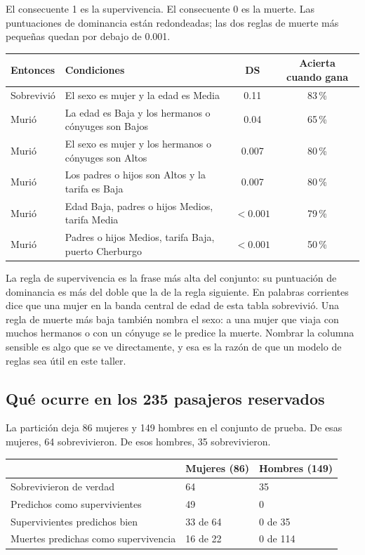 \documentclass[11pt]{article}
\newcommand{\pct}[1]{\mbox{#1\,\%}}
\begin{document}
El consecuente 1 es la supervivencia. El consecuente 0 es la muerte. Las puntuaciones de dominancia están redondeadas; las dos reglas de muerte más pequeñas quedan por debajo de 0.001.

\begin{table}[H]
\centering
\small
\begin{tabularx}{\textwidth}{@{}l Y c c@{}}
\toprule
Entonces & Condiciones & DS & Acierta cuando gana \\
\midrule
{}
Sobrevivió & El sexo es mujer y la edad es Media & 0.11 & \pct{83} \\
Murió & La edad es Baja y los hermanos o cónyuges son Bajos & 0.04 & \pct{65} \\
Murió & El sexo es mujer y los hermanos o cónyuges son Altos & 0.007 & \pct{80} \\
Murió & Los padres o hijos son Altos y la tarifa es Baja & 0.007 & \pct{80} \\
Murió & Edad Baja, padres o hijos Medios, tarifa Media & \(<0.001\) & \pct{79} \\
Murió & Padres o hijos Medios, tarifa Baja, puerto Cherburgo & \(<0.001\) & \pct{50} \\
\bottomrule
\end{tabularx}
\end{table}

La regla de supervivencia es la frase más alta del conjunto: su puntuación de dominancia es más del doble que la de la regla siguiente. En palabras corrientes dice que una mujer en la banda central de edad de esta tabla sobrevivió. Una regla de muerte más baja también nombra el sexo: a una mujer que viaja con muchos hermanos o con un cónyuge se le predice la muerte. Nombrar la columna sensible es algo que se ve directamente, y esa es la razón de que un modelo de reglas sea útil en este taller.

\subsection{Qué ocurre en los 235 pasajeros reservados}

La partición deja 86 mujeres y 149 hombres en el conjunto de prueba. De esas mujeres, 64 sobrevivieron. De esos hombres, 35 sobrevivieron.

\begin{table}[H]
\centering
\small
\begin{tabularx}{\textwidth}{@{}l Y Y@{}}
\toprule
 & Mujeres (86) & Hombres (149) \\
\midrule
Sobrevivieron de verdad & 64 & 35 \\
Predichos como supervivientes & 49 & 0 \\
Supervivientes predichos bien & 33 de 64 & 0 de 35 \\
Muertes predichas como supervivencia & 16 de 22 & 0 de 114 \\
\bottomrule
\end{tabularx}
\end{table}
\end{document}
